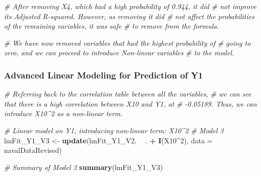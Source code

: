\documentclass[
]{article}
\newenvironment{Shaded}{\begin{snugshade}}{\end{snugshade}}
\newcommand{\CommentTok}[1]{\textcolor[rgb]{0.56,0.35,0.01}{\textit{#1}}}
\newcommand{\DataTypeTok}[1]{\textcolor[rgb]{0.13,0.29,0.53}{#1}}
\newcommand{\DecValTok}[1]{\textcolor[rgb]{0.00,0.00,0.81}{#1}}
\newcommand{\KeywordTok}[1]{\textcolor[rgb]{0.13,0.29,0.53}{\textbf{#1}}}
\newcommand{\NormalTok}[1]{#1}
\newcommand{\OperatorTok}[1]{\textcolor[rgb]{0.81,0.36,0.00}{\textbf{#1}}}
\newcommand{\StringTok}[1]{\textcolor[rgb]{0.31,0.60,0.02}{#1}}
\begin{document}
\begin{Shaded}
\begin{Highlighting}[]
\CommentTok{# After removing X4, which had a high probability of 0.944, it did  }
\CommentTok{# not improve its Adjusted R-squared. However, as removing it did  }
\CommentTok{# not affect the probabilities of the remaining variables, it was safe }
\CommentTok{# to remove from the formula.}

\CommentTok{# We have now removed variables that had the highest probability of}
\CommentTok{# going to zero, and we can proceed to introduce Non-linear variables}
\CommentTok{# to the model.}
\end{Highlighting}
\end{Shaded}

\hypertarget{advanced-linear-modeling-for-prediction-of-y1}{%
\subsubsection{Advanced Linear Modeling for Prediction of
Y1}\label{advanced-linear-modeling-for-prediction-of-y1}}

\begin{Shaded}
\begin{Highlighting}[]
\CommentTok{# Referring back to the correlation table between all the variables,}
\CommentTok{# we can see that there is a high correlation between X10 and Y1, at }
\CommentTok{# -0.05189. Thus, we can introduce X10^2 as a non-linear term.}

\CommentTok{# Linear model on Y1, introducing non-linear term: X10^2}
\CommentTok{# Model 3}
\NormalTok{lmFit_Y1_V3 <-}\StringTok{ }\KeywordTok{update}\NormalTok{(lmFit_Y1_V2, }\OperatorTok{~}\StringTok{ }\NormalTok{. }\OperatorTok{+}\StringTok{ }\KeywordTok{I}\NormalTok{(X10}\OperatorTok{^}\DecValTok{2}\NormalTok{), }\DataTypeTok{data =}\NormalTok{ navalDataRevised)}

\CommentTok{# Summary of Model 3}
\KeywordTok{summary}\NormalTok{(lmFit_Y1_V3)}
\end{Highlighting}
\end{Shaded}
\end{document}
